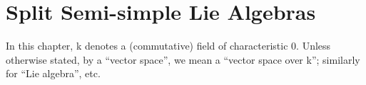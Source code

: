 \chapter{Split Semi-simple Lie Algebras}

In this chapter, k denotes a (commutative) field of characteristic 0. Unless otherwise stated, by a ``vector space'', we mean a ``vector space over k''; similarly for ``Lie algebra'', etc.

